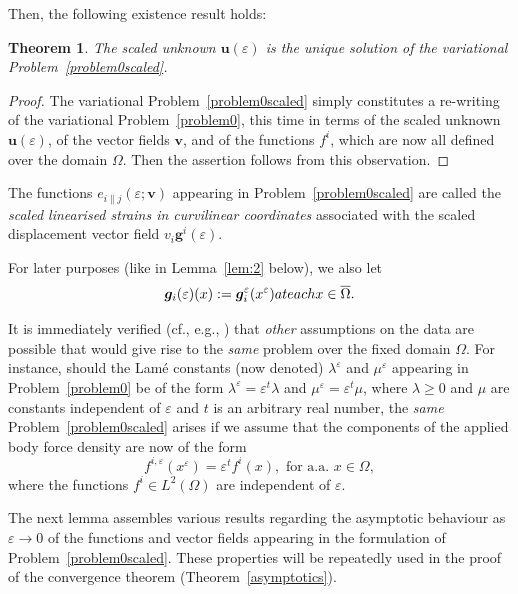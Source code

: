\documentclass{amsart}
\newtheorem{theorem}{Theorem}[section]
\begin{document}
Then, the following existence result holds:

\begin{theorem} \label{t:3}
The scaled unknown $\bm{u}(\varepsilon)$ is the unique solution of the variational Problem~\ref{problem0scaled}.
\end{theorem}
\begin{proof}
The variational Problem~\ref{problem0scaled} simply constitutes a re-writing of the variational Problem~\ref{problem0}, this time in terms of the scaled unknown $\bm{u}(\varepsilon)$, of the vector fields $\bm{v}$, and of the functions $f^i$, which are now all defined over the domain $\Omega$. Then the assertion follows from this observation.
\end{proof}

The functions $e_{i\|j}(\varepsilon;\bm{v})$ appearing in Problem~\ref{problem0scaled} are called the \emph{scaled linearised strains in curvilinear coordinates} associated with the scaled displacement vector field $v_i \bm{g}^i(\varepsilon)$.

For later purposes (like in Lemma~\ref{lem:2} below), we also let
$$
\bm{g}_i(\varepsilon)(x):=\bm{g}^\varepsilon_i(x^\varepsilon)\textup{ at each }x\in\overline{\Omega}.
$$

It is immediately verified (cf., e.g., \cite{Ciarlet2000}) that \emph{other} assumptions on the data are possible that would give rise to the \emph{same} problem over the fixed domain $\Omega$. For instance, should the Lam\'{e} constants (now denoted) $\lambda^\varepsilon$ and $\mu^\varepsilon$ appearing in Problem~\ref{problem0} be of the form $\lambda^\varepsilon = \varepsilon^t \lambda$ and $\mu^\varepsilon = \varepsilon^t \mu$, where $\lambda \ge 0$ and $\mu$ are constants independent of $\varepsilon$ and $t$ is an arbitrary real number, the \emph{same} Problem~\ref{problem0scaled} arises if we assume that the components of the applied body force density are now of the form
$$
f^{i, \varepsilon} (x^\varepsilon) = \varepsilon^{t} f^i(x), \text{ for a.a. } x\in \Omega,
$$
where the functions $f^i \in L^2(\Omega)$ are independent of $\varepsilon$.

The next lemma assembles various results regarding the asymptotic behaviour as $\varepsilon \to 0$ of the functions and vector fields appearing in the formulation of Problem~\ref{problem0scaled}. These properties will be repeatedly used in the proof of the convergence theorem (Theorem~\ref{asymptotics}).
\end{document}
